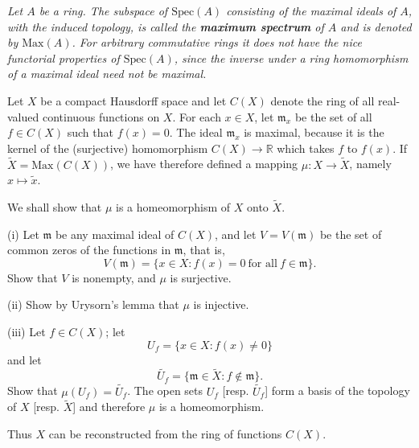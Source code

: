 \begin{problem}\em
Let $A$ be a ring. The subspace of $\mathrm{Spec}(A)$ consisting of the maximal ideals of $A$, with the induced topology, is called the \textbf{maximum spectrum} of $A$ and is denoted by $\mathrm{Max}(A)$. For arbitrary commutative rings it does not have the nice functorial properties of $\mathrm{Spec}(A)$, since the inverse under a ring homomorphism of a maximal ideal need not be maximal.\par
Let $X$ be a compact Hausdorff space and let $C(X)$ denote the ring of all real-valued continuous functions on $X$. For each $x\in X$, let $\mathfrak{m}_x$ be the set of all $f\in C(X)$ such that $f(x)=0$. The ideal $\mathfrak{m}_x$ is maximal, because it is the kernel of the (surjective) homomorphism $C(X)\to\mathbb{R}$ which takes $f$ to $f(x)$. If $\widetilde{X}=\mathrm{Max}(C(X))$, we have therefore defined a mapping $\mu:X\to\widetilde{X}$, namely $x\mapsto\widetilde{x}$.\par
We shall show that $\mu$ is a homeomorphism of $X$ onto $\widetilde{X}$.\par
(i) Let $\mathfrak{m}$ be any maximal ideal of $C(X)$, and let $V=V(\mathfrak{m})$ be the set of common zeros of the functions in $\mathfrak{m}$, that is, 
$$V(\mathfrak{m})=\{x\in X:f(x)=0\ \text{for all}\ f\in\mathfrak{m}\}.$$
Show that $V$ is nonempty, and $\mu$ is surjective.\par
(ii) Show by Urysorn's lemma that $\mu$ is injective.\par
(iii) Let $f\in C(X)$; let 
$$U_f=\{x\in X:f(x)\ne 0\}$$
and let 
$$\widetilde{U_f}=\{\mathfrak{m}\in\widetilde{X}:f\notin\mathfrak{m}\}.$$
Show that $\mu(U_f)=\widetilde{U_f}$. The open sets $U_f$ [resp. $\widetilde{U_f}$] form a basis of the topology of $X$ [resp. $\widetilde{X}$] and therefore $\mu$ is a homeomorphism.\par
Thus $X$ can be reconstructed from the ring of functions $C(X)$.
\end{problem}
